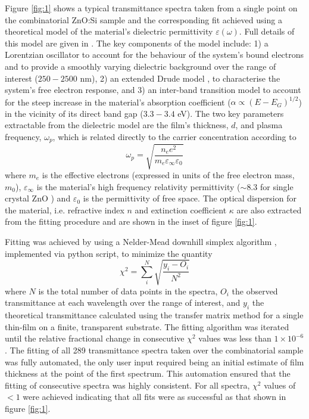 \documentclass[preprint]{elsarticle}
\begin{document}
Figure \ref{fig:1} shows a typical transmittance spectra taken from a single point on the combinatorial ZnO:Si sample and the corresponding fit achieved using a theoretical model of the material's dielectric permittivity $\varepsilon(\omega)$. Full details of this model are given in \cite{Treharne2012}. The key components of the model include: 1) a Lorentzian oscillator to account for the behaviour of the system's bound electrons and to provide a smoothly varying dielectric background over the range of interest ($250-2500$ nm), 2) an extended Drude model \cite{Mergel2002}, to characterise the system's free electron response, and 3) an inter-band transition model to account for the steep increase in the material's absorption coefficient ($\alpha \propto (E-E_G)^{1/2}$) in the vicinity of its direct band gap ($3.3 - 3.4$ eV). The two key parameters extractable from the dielectric model are the film's thickness, $d$, and plasma frequency, $\omega_{p}$, which is related directly to the carrier concentration according to
\begin{equation}
\label{eqn:1}
\omega_p = \sqrt{\frac{n_e e^2}{m_e\varepsilon_{\infty} \varepsilon_0}}
\end{equation}
where $m_e$ is the effective electrons (expressed in units of the free electron mass, $m_0$), $\varepsilon_{\infty}$ is the material's high frequency relativity permittivity  ($\sim 8.3$ for single crystal ZnO \citep{Ashkenov2003}) and $\varepsilon_0$ is the permittivity of free space. The optical dispersion for the material, i.e. refractive index $n$ and extinction coefficient $\kappa$ are also extracted from the fitting procedure and are shown in the inset of figure \ref{fig:1}.

Fitting was achieved by using a Nelder-Mead downhill simplex algorithm \cite{Nelder1965}, implemented via python script, to minimize the quantity
\begin{equation}
\chi^{2} = \sum_{i}^N\sqrt{\frac{y_i - O_i}{N^2}}
\end{equation}\label{eqn:2}
where $N$ is the total number of data points in the spectra, $O_i$ the observed transmittance at each wavelength over the range of interest, and $y_i$ the theoretical transmittance calculated using the transfer matrix method \cite{Macleod1986} for a single thin-film on a finite, transparent substrate.  The fitting algorithm was iterated until the relative fractional change in consecutive $\chi^2$ values was less than $1\times10^{-6}$. The fitting of all 289 transmittance spectra taken over the combinatorial sample was fully automated, the only user input required being an initial estimate of film thickness at the point of the first spectrum. This automation ensured that the fitting of consecutive spectra was highly consistent. For all spectra, $\chi^2$ values of $<1$ were achieved indicating that all fits were as successful as that shown in figure \ref{fig:1}.
\end{document}
